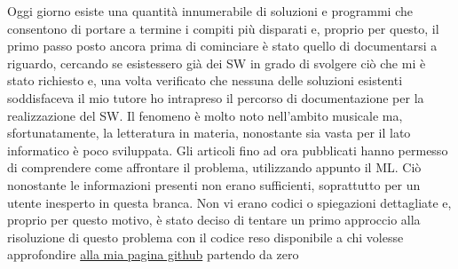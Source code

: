 \nocite{AfroDeeplearningBeats} \nocite{QuantifyMicrotiming}
Oggi giorno esiste una quantità innumerabile di soluzioni e programmi che consentono di portare a termine i compiti più disparati e, proprio per questo, il primo passo posto ancora prima di cominciare è stato quello di documentarsi a riguardo, cercando se esistessero già dei SW in grado di svolgere ciò che mi è stato richiesto e, una volta verificato che nessuna delle soluzioni esistenti soddisfaceva il mio tutore ho intrapreso il percorso di documentazione per la realizzazione del SW. Il fenomeno è molto noto nell'ambito musicale ma, sfortunatamente, la letteratura in materia, nonostante sia vasta per il lato informatico è poco sviluppata. Gli articoli fino ad ora pubblicati hanno permesso di comprendere come affrontare il problema, utilizzando appunto il ML. Ciò nonostante le informazioni presenti non erano sufficienti, soprattutto per un utente inesperto in questa branca. Non vi erano codici o spiegazioni dettagliate e, proprio per questo motivo, è stato deciso di tentare un primo approccio alla risoluzione di questo problema con il codice reso disponibile a chi volesse approfondire \href{https://github.com/cedrata/cedrata-detector}{alla mia pagina github} partendo da zero  